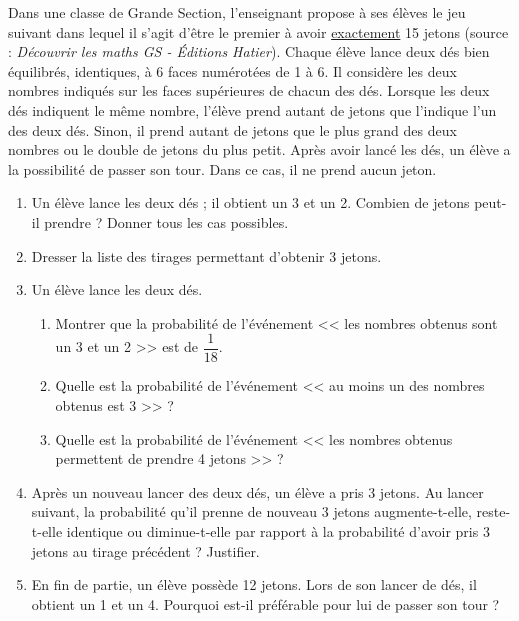 Dans une classe de Grande Section, l’enseignant propose à ses élèves le jeu suivant dans lequel il s’agit d’être le premier à avoir \underline{exactement} 15 jetons (source : {\it Découvrir les maths GS - Éditions Hatier}). \newline
   Chaque élève lance deux dés bien équilibrés, identiques, à 6 faces numérotées de 1 à 6. Il considère les deux nombres indiqués sur les faces supérieures de chacun des dés. \newline
   Lorsque les deux dés indiquent le même nombre, l’élève prend autant de jetons que l’indique l’un des deux dés. Sinon, il prend autant de jetons que le plus grand des deux nombres ou le double de jetons du plus petit. \newline
   Après avoir lancé les dés, un élève a la possibilité de passer son tour. Dans ce cas, il ne prend aucun jeton.
   \begin{enumerate}
      \setlength{\itemsep}{-1mm}
      \item Un élève lance les deux dés ; il obtient un 3 et un 2. Combien de jetons peut-il prendre ? \newline
         Donner tous les cas possibles.
      \item Dresser la liste des tirages permettant d’obtenir 3 jetons.
      \item Un élève lance les deux dés.
         \begin{enumerate}
            \setlength{\itemsep}{-1mm}
            \item Montrer que la probabilité de l’événement << les nombres obtenus sont un 3 et un 2 >> est de $\dfrac{1}{18}$.
            \item Quelle est la probabilité de l’événement << au moins un des nombres obtenus est 3 >> ?
            \item Quelle est la probabilité de l’événement << les nombres obtenus permettent de prendre 4 jetons >> ?
         \end{enumerate}
      \item Après un nouveau lancer des deux dés, un élève a pris 3 jetons. Au lancer suivant, la probabilité qu’il prenne de nouveau 3 jetons augmente-t-elle, reste-t-elle identique ou diminue-t-elle par rapport à la probabilité d’avoir pris 3 jetons au tirage précédent ? Justifier.
      \item En fin de partie, un élève possède 12 jetons. Lors de son lancer de dés, il obtient un 1 et un 4. Pourquoi est-il préférable pour lui de passer son tour ?
   \end{enumerate}